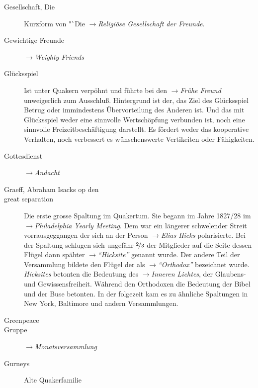 \begin{description}
 \item[Gesellschaft, Die] Kurzform von "`Die
 $\to$\textit{Religiöse Gesellschaft der Freunde}.

\item[Gewichtige Freunde] $\to$\textit{Weighty Friends}

\item[Glücksspiel] Ist unter Quakern verpöhnt und führte bei den
$\to$\textit{Frühe Freund} unweigerlich zum Ausschluß. Hintergrund ist der,
das Ziel des Glücksspiel Betrug oder immindestens Übervorteilung des Anderen
ist. Und das mit Glücksspiel weder eine sinnvolle Wertschöpfung verbunden ist,
noch eine sinnvolle Freizeitbeschäftigung darstellt. Es fördert weder das
kooperative Verhalten, noch verbessert es wünschenswerte Vertikeiten oder
Fähigkeiten.

\item[Gottesdienst] $\to$\textit{Andacht}

 \item[Graeff, Abraham Isacks op den]

 \item[great separation] Die erste grosse Spaltung im Quakertum. Sie begann im
 Jahre 1827/28 im $\to$\textit{Philadelphia Yearly Meeting}. Dem war ein
 längerer schwelender Streit vorrausgeggangen der sich an der Person
 $\to$\textit{Elias Hicks} polarisierte. Bei der Spaltung schlugen sich
 ungefähr $\nicefrac{2}{3}$ der Mitglieder auf die Seite dessen Flügel dann
 spähter $\to$\textit{"`Hicksite"'} genannt wurde. Der andere Teil der
 Versammlung bildete den Flügel der als $\to$\textit{"`Orthodox"'} bezeichnet
 wurde. \textit{Hicksites} betonten die Bedeutung des $\to$\textit{Inneren
 Lichtes}, der Glaubens- und Gewissensfreiheit. Während den Orthodoxen die
 Bedeutung der Bibel und der Buse betonten. In der folgezeit kam es zu
 ähnliche Spaltungen in New York, Baltimore und andern Versammlungen.

 \item[Greenpeace]

\item[Gruppe] $\to$\textit{Monatsversammlung}

\item[Gurneys] Alte Quakerfamilie


\end{description}
